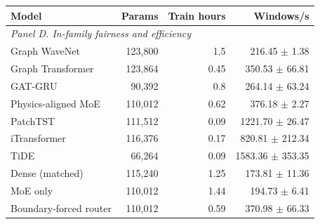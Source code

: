 \begin{table}[t]
\vspace{0.25em}
\begin{tabular}{lrrr}
\toprule
Model & Params & Train hours & Windows/s \\
\midrule
\multicolumn{4}{l}{\textit{Panel D. In-family fairness and efficiency}} \\
Graph WaveNet & 123,800 & 1.5 & 216.45 $\pm$ 1.38 \\
Graph Transformer & 123,864 & 0.45 & 350.53 $\pm$ 66.81 \\
GAT-GRU & 90,392 & 0.8 & 264.14 $\pm$ 63.24 \\
Physics-aligned MoE & 110,012 & 0.62 & 376.18 $\pm$ 2.27 \\
PatchTST & 111,512 & 0.09 & 1221.70 $\pm$ 26.47 \\
iTransformer & 116,376 & 0.17 & 820.81 $\pm$ 212.34 \\
TiDE & 66,264 & 0.09 & 1583.36 $\pm$ 353.35 \\
Dense (matched) & 115,240 & 1.25 & 173.81 $\pm$ 11.36 \\
MoE only & 110,012 & 1.44 & 194.73 $\pm$ 6.41 \\
Boundary-forced router & 110,012 & 0.59 & 370.98 $\pm$ 66.33 \\
\bottomrule
\end{tabular}
\end{table}
